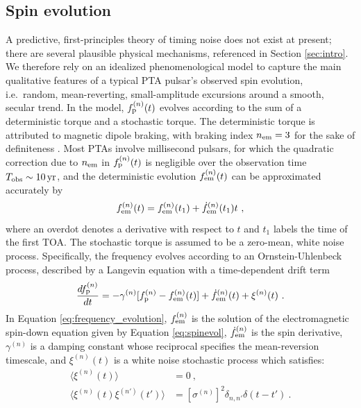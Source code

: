 \documentclass[fleqn,usenatbib,useAMS]{mnras}
\begin{document}
\subsection{Spin evolution} \label{sec:psr_frequency}
A predictive, first-principles theory of timing noise does not exist at present; there are several plausible physical mechanisms, referenced in Section \ref{sec:intro}. We therefore rely on an idealized phenomenological model to capture the main qualitative features of a typical PTA pulsar's observed spin evolution, i.e.\ random, mean-reverting, small-amplitude excursions around a smooth, secular trend. In the model, $f_{\rm p}^{(n)}(t)$ evolves according to the sum of a deterministic torque and a stochastic torque. The deterministic torque is attributed to magnetic dipole braking, with braking index $n_{\rm em}=3$ for the sake of definiteness \citep{1969ApJ...157..869G}. Most PTAs involve millisecond pulsars, for which the quadratic correction due to $n_{\rm em}$ in $f_{\rm p}^{(n)}(t)$ is negligible over the observation time $T_{\rm obs} \sim 10 \, {\rm yr}$, and the deterministic evolution $f_{\rm em}^{(n)}(t)$ can be approximated accurately by 
\begin{equation}
 f_{\rm em}^{(n)}(t) = f_{\rm em}^{(n)}(t_1) + \dot{f}_{\rm em}^{(n)}(t_1)t \ , \label{eq:spinevol}
\end{equation} where an overdot denotes a derivative with respect to $t$ and $t_1$ labels the time of the first TOA. The stochastic torque is assumed to be a zero-mean, white noise process. Specifically, the frequency evolves according to an Ornstein-Uhlenbeck process, described by a Langevin equation with a time-dependent drift term \citep{Vargas}
\begin{equation}
	\frac{df_{\rm p}^{(n)}}{dt} = -\gamma^{(n)}	 [f_{\rm p}^{(n)} - f_{\rm em}^{(n)} (t)] + \dot{f}_{\rm em}^{(n)}(t) +\xi^{(n)}(t) \ . 
	\label{eq:frequency_evolution}
\end{equation}
In Equation \eqref{eq:frequency_evolution}, $f_{\rm em}^{(n)}$ is the solution of the electromagnetic spin-down equation given by Equation \eqref{eq:spinevol}, $\dot{f}_{\rm em}^{(n)}$ is the spin derivative, $\gamma^{(n)}$ is a damping constant whose reciprocal specifies the mean-reversion timescale, and $\xi^{(n)}(t)$ is a white noise stochastic process which satisfies:
\begin{align}
	\langle \xi^{(n)}(t) \rangle &= 0 \ , \\
	\langle \xi^{(n)}(t) \xi^{(n')}(t') \rangle &= [\sigma^{(n)}]^2 \delta_{n,n'} \delta (t - t') \ .	\label{eq:xieqn}
\end{align}
\end{document}

